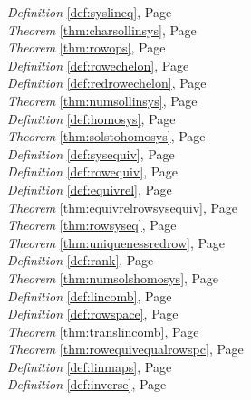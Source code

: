 \begin{multicols}{3}
\begin{center}
      \textit{Definition} \ref{def:syslineq}, Page \pageref{def:syslineq} \\
      \textit{Theorem} \ref{thm:charsollinsys}, Page \pageref{thm:charsollinsys} \\
      \textit{Theorem} \ref{thm:rowops}, Page \pageref{thm:rowops} \\
      \textit{Definition} \ref{def:rowechelon}, Page \pageref{def:rowechelon} \\
      \textit{Definition} \ref{def:redrowechelon}, Page \pageref{def:redrowechelon} \\
      \textit{Theorem} \ref{thm:numsollinsys}, Page \pageref{thm:numsollinsys} \\
      \textit{Definition} \ref{def:homosys}, Page \pageref{def:homosys} \\
      \textit{Theorem} \ref{thm:solstohomosys}, Page \pageref{thm:solstohomosys} \\
      \textit{Definition} \ref{def:sysequiv}, Page \pageref{def:sysequiv} \\
      \textit{Definition} \ref{def:rowequiv}, Page \pageref{def:rowequiv} \\
      \textit{Definition} \ref{def:equivrel}, Page \pageref{def:equivrel} \\
      \textit{Theorem} \ref{thm:equivrelrowsysequiv}, Page \pageref{thm:equivrelrowsysequiv} \\
      \textit{Theorem} \ref{thm:rowsyseq}, Page \pageref{thm:rowsyseq} \\
      \textit{Theorem} \ref{thm:uniquenessredrow}, Page \pageref{thm:uniquenessredrow} \\
      \textit{Definition} \ref{def:rank}, Page \pageref{def:rank} \\
      \textit{Theorem} \ref{thm:numsolshomosys}, Page \pageref{thm:numsolshomosys} \\
      \textit{Definition} \ref{def:lincomb}, Page \pageref{def:lincomb} \\
      \textit{Definition} \ref{def:rowspace}, Page \pageref{def:rowspace} \\
      \textit{Theorem} \ref{thm:translincomb}, Page \pageref{thm:translincomb} \\
      \textit{Theorem} \ref{thm:rowequivequalrowspc}, Page \pageref{thm:rowequivequalrowspc} \\
      \textit{Definition} \ref{def:linmaps}, Page \pageref{def:linmaps} \\
      \textit{Definition} \ref{def:inverse}, Page \pageref{def:inverse} \\

\end{center}
\end{multicols}
